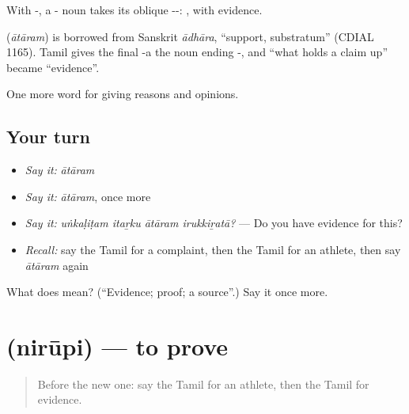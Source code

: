 With -, a - noun takes its oblique --: , with evidence.

\begin{cousinweb}
\textbf{} (\emph{ātāram}) is borrowed from Sanskrit \emph{ādhāra}, \textquotedblleft{}support, substratum\textquotedblright{} (CDIAL 1165). Tamil gives the final -a the noun ending -, and \textquotedblleft{}what holds a claim up\textquotedblright{} became \textquotedblleft{}evidence\textquotedblright{}.
\end{cousinweb}

\begin{grammarlens}[title={What you've built}]
One more word for giving reasons and opinions.
\end{grammarlens}

\subsection*{Your turn}
\begin{itemize}
\raggedright
  \item \emph{Say it:} \emph{ātāram}
  \item \emph{Say it:} \emph{ātāram}, once more
  \item \emph{Say it:} \emph{uṅkaḷiṭam itaṟku ātāram irukkiṟatā?} — Do you have evidence for this?
  \item \emph{Recall:} say the Tamil for a complaint, then the Tamil for an athlete, then say \emph{ātāram} again
\end{itemize}

\begin{tcolorbox}[breakable,colback=teal!4,colframe=teal!35!black,title={Before you move on}]
What does  mean? (\textquotedblleft{}Evidence; proof; a source\textquotedblright{}.) Say it once more.
\end{tcolorbox}
\section[\texorpdfstring{\ta{நிரூபி} (nirūpi)}{நிரூபி (nirūpi)}]{ (nirūpi) — to prove}

\label{lesson:TA-C347-nirupi}



\begin{quote}
Before the new one: say the Tamil for an athlete, then the Tamil for evidence.
\end{quote}

